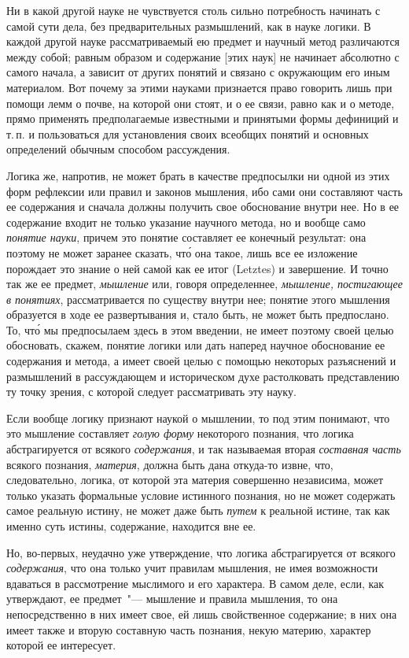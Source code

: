Ни в какой другой науке не чувствуется столь сильно
потребность начинать с самой сути дела, без предварительных
размышлений, как в науке логики. В каждой
другой науке рассматриваемый ею предмет и научный
метод различаются между собой; равным образом и содержание
[этих наук] не начинает абсолютно с самого
начала, а зависит от других понятий и связано с окружающим
его иным материалом. Вот почему за этими науками
признается право говорить лишь при помощи лемм
о почве, на которой они стоят, и о ее связи, равно как
и о методе, прямо применять предполагаемые известными
и принятыми формы дефиниций и т.\,п. и пользоваться
для установления своих всеобщих понятий и основных
определений обычным способом рассуждения.

Логика же, напротив, не может брать в качестве
предпосылки ни одной из этих форм рефлексии или
правил и законов мышления, ибо сами они составляют
часть ее содержания и сначала должны получить свое
обоснование внутри нее. Но в ее содержание входит не
только указание научного метода, но и вообще само
\emph{понятие науки}, причем это понятие составляет ее конечный
результат: она поэтому не может заранее сказать,
чт\'о она такое, лишь все ее изложение порождает это
знание о ней самой как ее итог (Letztes) и завершение.
И точно так же ее предмет, \emph{мышление} или, говоря определеннее,
\emph{мышление, постигающее в понятиях}, рассматривается
по существу внутри нее; понятие этого мышления
образуется в ходе ее развертывания и, стало быть,
не может быть предпослано. То, чт\'о мы предпосылаем
здесь в этом введении, не имеет поэтому своей целью
обосновать, скажем, понятие логики или дать наперед
научное обоснование ее содержания и метода, а имеет
своей целью с помощью некоторых разъяснений и размышлений
в рассуждающем и историческом духе растолковать
представлению ту точку зрения, с которой
следует рассматривать эту науку.

Если вообще логику признают наукой о мышлении,
то под этим понимают, что это мышление составляет
\emph{голую форму} некоторого познания, что логика абстрагируется
от всякого \emph{содержания}, и так называемая вторая
\emph{составная часть} всякого познания, \emph{материя}, должна быть
дана откуда-то извне, что, следовательно, логика, от которой
эта материя совершенно независима, может только
указать формальные условие истинного познания, но не
может содержать самое реальную истину, не может даже
быть \emph{путем} к реальной истине, так как именно суть истины,
содержание, находится вне ее.

Но, во-первых, неудачно уже утверждение, что логика
абстрагируется от всякого \emph{содержания}, что она только
учит правилам мышления, не имея возможности вдаваться
в рассмотрение мыслимого и его характера. В самом
деле, если, как утверждают, ее предмет~"--- мышление
и правила мышления, то она непосредственно в них имеет
свое, ей лишь свойственное содержание; в них она имеет
также и вторую составную часть познания, некую материю,
характер которой ее интересует.

